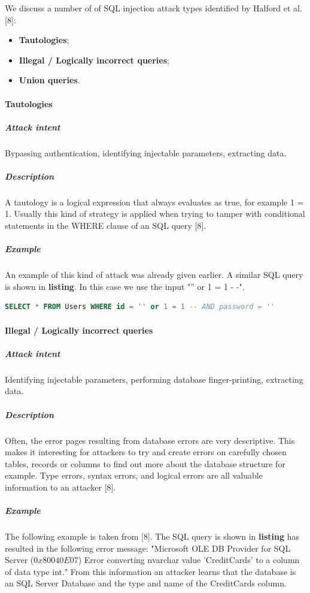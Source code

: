 We discuss a number of of SQL injection attack types identified by Halford et al. [8]:
\begin{itemize}
	\item \textbf{Tautologies};
	\item \textbf{Illegal / Logically incorrect queries};
	\item \textbf{Union queries}.
\end{itemize}


\paragraph{Tautologies}

\subparagraph{Attack intent} Bypassing authentication, identifying injectable parameters, extracting data.
\subparagraph{Description} A tautology is a logical expression that always evaluates as true, for example 1 = 1. Usually this kind of strategy is applied when trying to tamper with conditional statements in the WHERE clause of an SQL query [8].
\subparagraph{Example} An example of this kind of attack was already given earlier. A similar SQL query is shown in \textbf{listing}. In this case we use the input "'' or 1 = 1 - -".

\begin{lstlisting}[language=sql, caption=Tautology in an SQL string., label=listing:sql-injection:tautology]
SELECT * FROM Users WHERE id = '' or 1 = 1 -- AND password = ''
\end{lstlisting}

\paragraph{Illegal / Logically incorrect queries}

\subparagraph{Attack intent} Identifying injectable parameters, performing database finger-printing, extracting data.
\subparagraph{Description} Often, the error pages resulting from database errors are very descriptive. This makes it interesting for attackers to try and create errors on carefully chosen tables, records or columns to find out more about the database structure for example. Type errors, syntax errors, and logical errors are all valuable information to an attacker [8].
\subparagraph{Example} The following example is taken from [8]. The SQL query is shown in \textbf{listing} has resulted in the following error message: "Microsoft OLE DB Provider for SQL Server ($0x80040E07$) Error converting nvarchar value 'CreditCards' to a column of data type int." From this information an attacker learns that the database is an SQL Server Database and the type and name of the CreditCards column.

